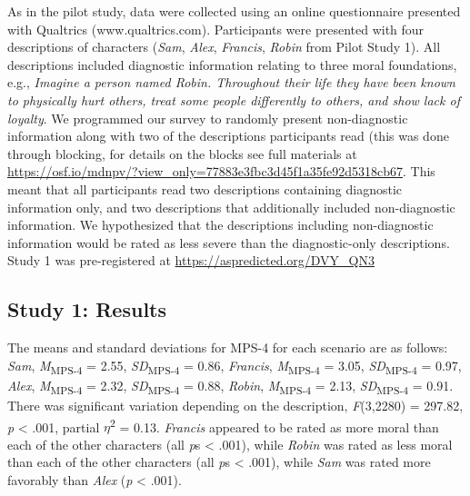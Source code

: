 \documentclass[
  man,floatsintext]{apa7}
\begin{document}
As in the pilot study, data were collected using an online questionnaire presented with Qualtrics (www.qualtrics.com). Participants were presented with four descriptions of characters (\emph{Sam}, \emph{Alex}, \emph{Francis}, \emph{Robin} from Pilot Study 1). All descriptions included diagnostic information relating to three moral foundations, e.g., \emph{Imagine a person named Robin. Throughout their life they have been known to physically hurt others, treat some people differently to others, and show lack of loyalty}. We programmed our survey to randomly present non-diagnostic information along with two of the descriptions participants read (this was done through blocking, for details on the blocks see full materials at \color{blue}\url{https://osf.io/mdnpv/?view_only=77883e3fbc3d45f1a35fe92d5318cb67}\color{black}. This meant that all participants read two descriptions containing diagnostic information only, and two descriptions that additionally included non-diagnostic information. We hypothesized that the descriptions including non-diagnostic information would be rated as less severe than the diagnostic-only descriptions. Study 1 was pre-registered at \color{blue}\url{https://aspredicted.org/DVY_QN3}\color{black}

\subsection{Study 1: Results}\label{study-1-results}

The means and standard deviations for MPS-4 for each scenario are as follows:
\emph{Sam},
\emph{M}\textsubscript{MPS-4} = 2.55, \emph{SD}\textsubscript{MPS-4} = 0.86,
\emph{Francis},
\emph{M}\textsubscript{MPS-4} = 3.05, \emph{SD}\textsubscript{MPS-4} = 0.97,
\emph{Alex},
\emph{M}\textsubscript{MPS-4} = 2.32, \emph{SD}\textsubscript{MPS-4} = 0.88,
\emph{Robin},
\emph{M}\textsubscript{MPS-4} = 2.13, \emph{SD}\textsubscript{MPS-4} = 0.91. There was significant variation depending on the description, \emph{F}(3,2280) = 297.82, \emph{p} \textless{} .001, partial \(\eta\)\textsuperscript{2} = 0.13. \emph{Francis} appeared to be rated as more moral than each of the other characters (all \emph{p}s \textless{} .001), while \emph{Robin} was rated as less moral than each of the other characters (all \emph{p}s \textless{} .001), while \emph{Sam} was rated more favorably than \emph{Alex} (\emph{p} \textless{} .001).
\end{document}
